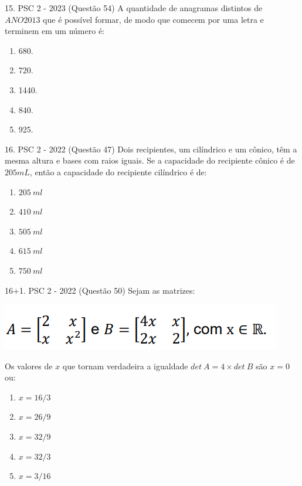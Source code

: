 \documentclass[aspectratio=169]{beamer}
\newif\ifusarcorvermelha
\newcommand{\vermelho}[1]{%
    \ifusarcorvermelha
        {\color{red}#1}%
    \else
        #1%
    \fi
}
\begin{document}
    \begin{frame}{15. PSC 2 - 2023 (Questão 54)}
        A quantidade de anagramas distintos de $ANO2013$ que é possível formar, de modo que comecem por uma letra e terminem em um número é:
       
         \begin{enumerate}[a]
            \item 680.
            \item 720.
            \item \vermelho{1440.}
            \item 840.
            \item 925.

        \end{enumerate}        
    \end{frame}

    \begin{frame}{16. PSC 2 - 2022 (Questão 47)}
        Dois recipientes, um cilíndrico e um cônico, têm a mesma altura e bases com raios iguais. Se a capacidade do recipiente cônico é de $205 mL$, então a capacidade do recipiente cilíndrico é de:

        \begin{enumerate}[a]
            \item $205\ ml$
            \item $410\ ml$
            \item $505\ ml$
            \item \vermelho{$615\ ml$} %
            \item $750\ ml$

        \end{enumerate}        
    \end{frame}

    \begin{frame}{16+1. PSC 2 - 2022 (Questão 50)}
        Sejam as matrizes:

        \begin{center}
            \includegraphics[scale=0.5]{questãoPSC2022Q50.png}
        \end{center} Os valores de $x$ que tornam verdadeira a igualdade $det\  A = 4 \times det\ B$ são $x=0$ ou:

        \begin{enumerate}[a]
            \item $x={16}/{3}$
            \item $x={26}/{9}$
            \item \vermelho{$x={32}/{9}$} %
            \item $x={32}/{3}$
            \item $x={3}/{16}$

        \end{enumerate}        
    \end{frame}
\end{document}
